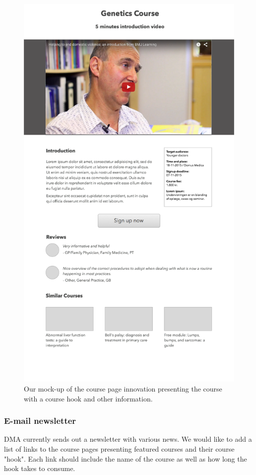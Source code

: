 \begin{figure}[h!]
 \begin{center}
  \includegraphics[width=1\textwidth]{figures/course_page_prototype.png}
  \caption{Our mock-up of the course page innovation presenting the course with a course hook and other information.\label{fig:course_page}}
 \end{center}
\end{figure}

\subsubsection{E-mail newsletter}
DMA currently sends out a newsletter with various news. We would like to add a list of links to the course pages presenting featured courses and their course "hook". Each link should include the name of the course as well as how long the hook takes to consume.


